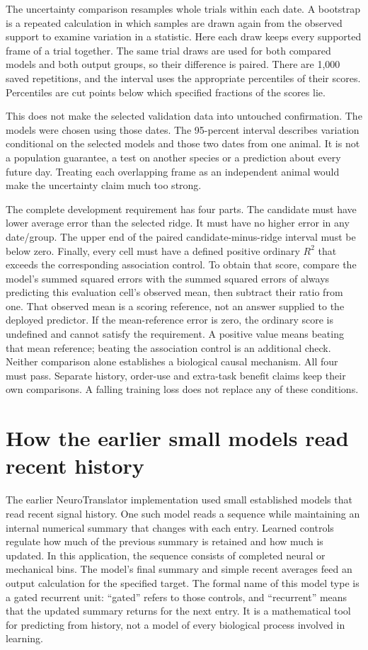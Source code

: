 The uncertainty comparison resamples whole trials within each date. A bootstrap
is a repeated calculation in which samples are drawn again from the observed
support to examine variation in a statistic. Here each draw keeps every supported
frame of a trial together. The same trial draws are used for both compared models
and both output groups, so their difference is paired. There are 1,000 saved
repetitions, and the interval uses the appropriate percentiles of their scores. Percentiles are cut points below which specified fractions of the scores lie.

This does not make the selected validation data into untouched confirmation.
The models were chosen using those dates. The 95-percent interval describes
variation conditional on the selected models and those two dates from one
animal. It is not a population guarantee, a test on another species or a
prediction about every future day. Treating each overlapping frame as an
independent animal would make the uncertainty claim much too strong.

The complete development requirement has four parts. The candidate must have
lower average error than the selected ridge. It must have no higher error in
any date/group. The upper end of the paired candidate-minus-ridge interval must
be below zero. Finally, every cell must have a defined positive ordinary
$R^2$ that exceeds the corresponding association control. To obtain that score,
compare the model's summed squared errors with the summed squared errors of
always predicting this evaluation cell's observed mean, then subtract their
ratio from one. That observed mean is a scoring reference, not an answer supplied
to the deployed predictor. If the mean-reference error is zero, the ordinary score is
undefined and cannot satisfy the requirement. A positive value means beating
that mean reference; beating the association control is an additional check.
Neither comparison alone establishes a biological causal mechanism. All four
must pass.
Separate history, order-use and extra-task benefit claims keep their own
comparisons. A falling training loss does not replace any of these conditions.


\section{How the earlier small models read recent history}

The earlier NeuroTranslator implementation used small established models that read recent signal history. One such model reads a sequence while maintaining an internal numerical summary that changes with each entry. Learned controls regulate how much of the previous summary is retained and how much is updated. In this application, the sequence consists of completed neural or mechanical bins. The model's final summary and simple recent averages feed an output calculation for the specified target. The formal name of this model type is a gated recurrent unit: ``gated'' refers to those controls, and ``recurrent'' means that the updated summary returns for the next entry. It is a mathematical tool for predicting from history, not a model of every biological process involved in learning.


